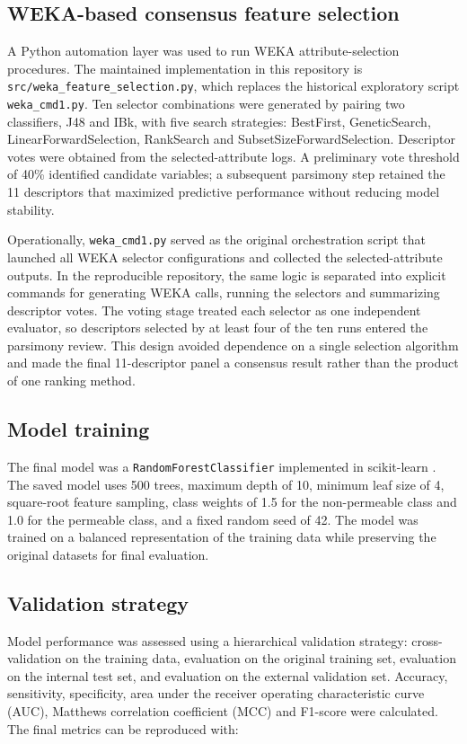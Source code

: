 \documentclass[11pt]{article}
\begin{document}
\subsection{WEKA-based consensus feature selection}
A Python automation layer was used to run WEKA attribute-selection procedures. The maintained implementation in this repository is \texttt{src/weka\_feature\_selection.py}, which replaces the historical exploratory script \texttt{weka\_cmd1.py}. Ten selector combinations were generated by pairing two classifiers, J48 and IBk, with five search strategies: BestFirst, GeneticSearch, LinearForwardSelection, RankSearch and SubsetSizeForwardSelection. Descriptor votes were obtained from the selected-attribute logs. A preliminary vote threshold of 40\% identified candidate variables; a subsequent parsimony step retained the 11 descriptors that maximized predictive performance without reducing model stability.

Operationally, \texttt{weka\_cmd1.py} served as the original orchestration script that launched all WEKA selector configurations and collected the selected-attribute outputs. In the reproducible repository, the same logic is separated into explicit commands for generating WEKA calls, running the selectors and summarizing descriptor votes. The voting stage treated each selector as one independent evaluator, so descriptors selected by at least four of the ten runs entered the parsimony review. This design avoided dependence on a single selection algorithm and made the final 11-descriptor panel a consensus result rather than the product of one ranking method.

\subsection{Model training}
The final model was a \texttt{RandomForestClassifier} implemented in scikit-learn \cite{Pedregosa2011}. The saved model uses 500 trees, maximum depth of 10, minimum leaf size of 4, square-root feature sampling, class weights of 1.5 for the non-permeable class and 1.0 for the permeable class, and a fixed random seed of 42. The model was trained on a balanced representation of the training data while preserving the original datasets for final evaluation.

\subsection{Validation strategy}
Model performance was assessed using a hierarchical validation strategy: cross-validation on the training data, evaluation on the original training set, evaluation on the internal test set, and evaluation on the external validation set. Accuracy, sensitivity, specificity, area under the receiver operating characteristic curve (AUC), Matthews correlation coefficient (MCC) and F1-score were calculated. The final metrics can be reproduced with:
\end{document}
